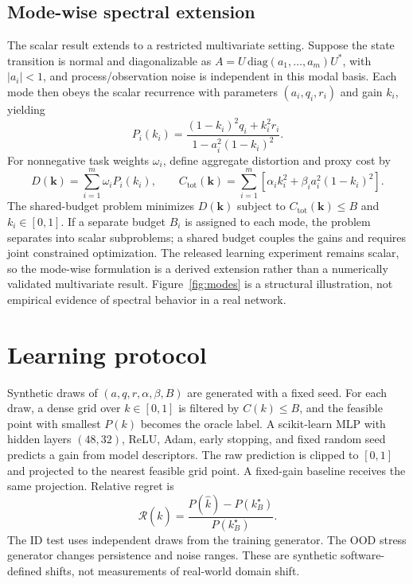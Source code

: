 \documentclass[10pt,a4paper]{article}
\begin{document}
\subsection{Mode-wise spectral extension}
The scalar result extends to a restricted multivariate setting. Suppose the state transition is normal and diagonalizable as $A=U\,\mathrm{diag}(a_1,\ldots,a_m)U^\ast$, with $|a_i|<1$, and process/observation noise is independent in this modal basis. Each mode then obeys the scalar recurrence with parameters $(a_i,q_i,r_i)$ and gain $k_i$, yielding
\begin{equation}
P_i(k_i)=\frac{(1-k_i)^2q_i+k_i^2r_i}{1-a_i^2(1-k_i)^2}.
\label{eq:mode-mse}
\end{equation}
For nonnegative task weights $\omega_i$, define aggregate distortion and proxy cost by
\begin{equation}
D(\mathbf{k})=\sum_{i=1}^{m}\omega_iP_i(k_i),\qquad
C_{\mathrm{tot}}(\mathbf{k})=\sum_{i=1}^{m}\left[\alpha_i k_i^2+\beta_i a_i^2(1-k_i)^2\right].
\label{eq:mode-objective}
\end{equation}
The shared-budget problem minimizes $D(\mathbf{k})$ subject to $C_{\mathrm{tot}}(\mathbf{k})\leq B$ and $k_i\in[0,1]$. If a separate budget $B_i$ is assigned to each mode, the problem separates into scalar subproblems; a shared budget couples the gains and requires joint constrained optimization. The released learning experiment remains scalar, so the mode-wise formulation is a derived extension rather than a numerically validated multivariate result. Figure~\ref{fig:modes} is a structural illustration, not empirical evidence of spectral behavior in a real network.

\section{Learning protocol}
Synthetic draws of $(a,q,r,\alpha,\beta,B)$ are generated with a fixed seed. For each draw, a dense grid over $k\in[0,1]$ is filtered by $C(k)\leq B$, and the feasible point with smallest $P(k)$ becomes the oracle label. A scikit-learn MLP with hidden layers $(48,32)$, ReLU, Adam, early stopping, and fixed random seed predicts a gain from model descriptors. The raw prediction is clipped to $[0,1]$ and projected to the nearest feasible grid point. A fixed-gain baseline receives the same projection. Relative regret is
\begin{equation}
\mathcal{R}(\widehat{k})=\frac{P(\widehat{k})-P(k_B^\star)}{P(k_B^\star)}.
\label{eq:regret}
\end{equation}
The ID test uses independent draws from the training generator. The OOD stress generator changes persistence and noise ranges. These are synthetic software-defined shifts, not measurements of real-world domain shift.
\end{document}
